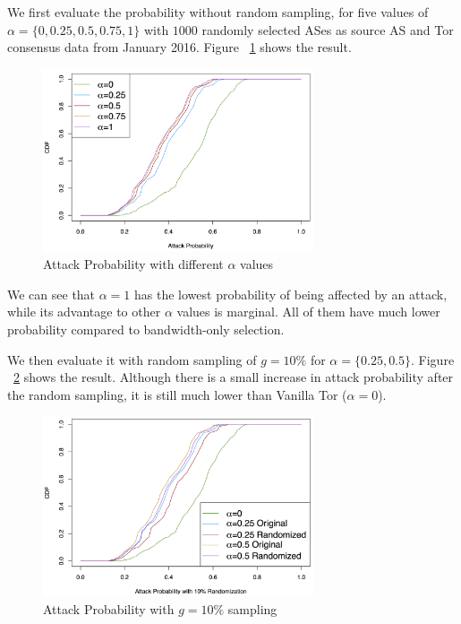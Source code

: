 We first evaluate the probability without random sampling, for five values of $\alpha=\{0, 0.25, 0.5, 0.75, 1\}$ with $1000$ randomly selected ASes as source AS and Tor consensus data from January 2016. Figure ~\ref{fig_attack} shows the result. 

\begin{figure}[ht!]
\centering
\includegraphics[width=80mm]{figure/attack}
\caption{Attack Probability with different $\alpha$ values \label{fig_attack}}
\end{figure}

We can see that $\alpha=1$ has the lowest probability of being affected by an attack, while its advantage to other $\alpha$ values is marginal. All of them have much lower probability compared to bandwidth-only selection. 

We then evaluate it with random sampling of $g=10\%$ for $\alpha=\{0.25, 0.5\}$. Figure ~\ref{fig_attack_random} shows the result. Although there is a small increase in attack probability after the random sampling, it is still much lower than Vanilla Tor ($\alpha=0$). 

\begin{figure}[ht!]
\centering
\includegraphics[width=80mm]{figure/attack_randomize}
\caption{Attack Probability with $g=10\%$ sampling \label{fig_attack_random}}
\end{figure}


